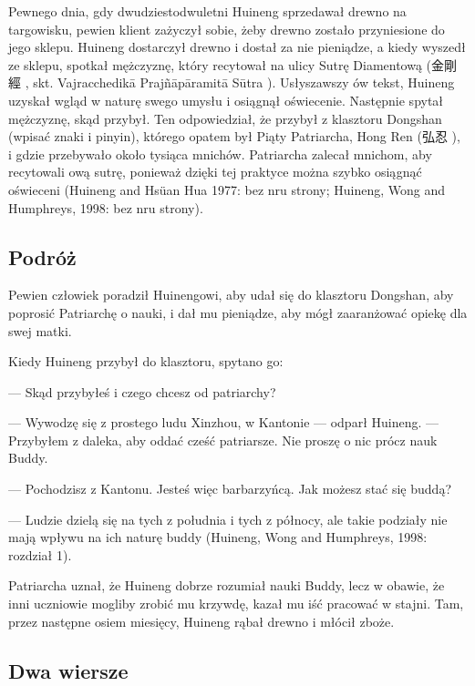 Pewnego dnia, gdy dwudziestodwuletni Huineng sprzedawał drewno na targowisku, pewien klient zażyczył sobie, żeby drewno zostało przyniesione do jego sklepu. Huineng dostarczył drewno i dostał za nie pieniądze, a kiedy wyszedł ze sklepu, spotkał mężczyznę, który recytował na ulicy Sutrę Diamentową (金剛經 , skt. Vajracchedikā Prajñāpāramitā Sūtra %
). Usłyszawszy ów tekst, Huineng uzyskał wgląd w naturę swego umysłu i osiągnął oświecenie. Następnie spytał mężczyznę, skąd przybył. Ten odpowiedział, że przybył z klasztoru Dongshan (wpisać znaki i pinyin), którego opatem był Piąty Patriarcha, Hong Ren (弘忍 ), i gdzie przebywało około tysiąca mnichów. Patriarcha zalecał mnichom, aby recytowali ową sutrę, ponieważ dzięki tej praktyce można szybko osiągnąć oświeceni (Huineng and Hsüan Hua 1977: bez nru strony; Huineng, Wong and Humphreys, 1998: bez nru strony).

\subsection{Podróż}
Pewien człowiek poradził Huinengowi, aby udał się do klasztoru Dongshan, aby poprosić Patriarchę o nauki, i dał mu pieniądze, aby mógł zaaranżować opiekę dla swej matki.

Kiedy Huineng przybył do klasztoru, spytano go:

--- Skąd przybyłeś i czego chcesz od patriarchy?

--- Wywodzę się z prostego ludu Xinzhou, w Kantonie --- odparł Huineng. --- Przybyłem z daleka, aby oddać cześć patriarsze. Nie proszę o nic prócz nauk Buddy.

--- Pochodzisz z Kantonu. Jesteś więc barbarzyńcą. Jak możesz stać się buddą?

--- Ludzie dzielą się na tych z południa i tych z północy, ale takie podziały nie mają wpływu na ich naturę buddy (Huineng, Wong and Humphreys, 1998: rozdział 1).

Patriarcha uznał, że Huineng dobrze rozumiał nauki Buddy, lecz w obawie, że inni uczniowie mogliby zrobić mu krzywdę, kazał mu iść pracować w stajni. Tam, przez następne osiem miesięcy, Huineng rąbał drewno i młócił zboże.

\subsection{Dwa wiersze}

